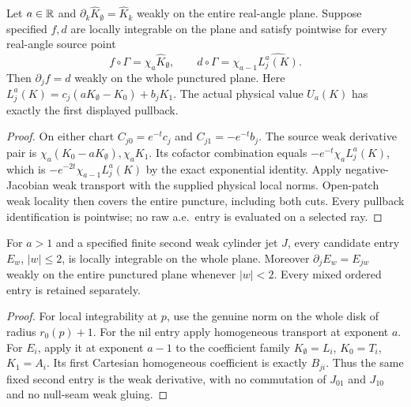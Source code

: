 \begin{lemma}
\label{lem:cylinder-physical-weak-partial}
\leanok
Let $a\in\mathbb{R}$ and $\partial_k\widehat K_\emptyset=\widehat K_k$ weakly
on the entire real-angle plane.
Suppose specified $f,d$ are locally integrable on the plane and satisfy
pointwise for every real-angle source point
\[
 f\circ\Gamma=\chi_a\widehat K_\emptyset,\qquad
 d\circ\Gamma=\chi_{a-1}\widehat{L_j^a(K)}.
\]
Then $\partial_jf=d$ weakly on the whole punctured plane.
Here $L_j^a(K)=c_j(aK_\emptyset-K_0)+b_jK_1$.
The actual physical value $U_a(K)$ has exactly the first displayed pullback.
\end{lemma}

\begin{proof}
\leanok
On either chart $C_{j0}=e^{-t}c_j$ and $C_{j1}=-e^{-t}b_j$.
The source weak derivative pair is
$\chi_a(K_0-aK_\emptyset),\chi_aK_1$.
Its cofactor combination equals $-e^{-t}\chi_aL_j^a(K)$, which is
$-e^{-2t}\chi_{a-1}L_j^a(K)$ by the exact exponential identity.
Apply negative-Jacobian weak transport with the supplied physical local norms.
Open-patch weak locality then covers the entire puncture, including both cuts.
Every pullback identification is pointwise; no raw a.e.\ entry is evaluated
on a selected ray.
\end{proof}

\begin{lemma}
\label{lem:cylinder-cartesian-weak-pairs}
\leanok
For $a>1$ and a specified finite second weak cylinder jet $J$, every candidate
entry $E_w$, $|w|\le2$, is locally integrable on the whole plane.
Moreover $\partial_jE_w=E_{jw}$ weakly on the entire punctured plane whenever
$|w|<2$. Every mixed ordered entry is retained separately.
\end{lemma}

\begin{proof}
\leanok
For local integrability at $p$, use the genuine norm on the whole disk
of radius $r_0(p)+1$.
For the nil entry apply homogeneous transport at exponent $a$.
For $E_i$, apply it at exponent $a-1$ to the coefficient family
$K_\emptyset=L_i$, $K_0=T_i$, $K_1=A_i$.
Its first Cartesian homogeneous coefficient is exactly $B_{ji}$.
Thus the same fixed second entry is the weak derivative, with no commutation
of $J_{01}$ and $J_{10}$ and no null-seam weak gluing.
\end{proof}

